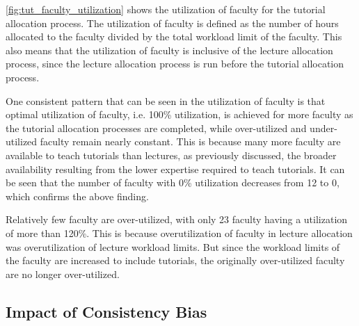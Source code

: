 \autoref{fig:tut_faculty_utilization} shows the utilization of faculty for the tutorial allocation process. The utilization of faculty is defined as the number of hours allocated to the faculty divided by the total workload limit of the faculty. This also means that the utilization of faculty is inclusive of the lecture allocation process, since the lecture allocation process is run before the tutorial allocation process.

One consistent pattern that can be seen in the utilization of faculty is that optimal utilization of faculty, i.e. 100\% utilization, is achieved for more faculty as the tutorial allocation processes are completed, while over-utilized and under-utilized faculty remain nearly constant. This is because many more faculty are available to teach tutorials than lectures, as previously discussed, the broader availability resulting from the lower expertise required to teach tutorials. It can be seen that the number of faculty with 0\% utilization decreases from 12 to 0, which confirms the above finding.

Relatively few faculty are over-utilized, with only 23 faculty having a utilization of more than 120\%. This is because overutilization of faculty in lecture allocation was overutilization of lecture workload limits. But since the workload limits of the faculty are increased to include tutorials, the originally over-utilized faculty are no longer over-utilized.

\subsection{Impact of Consistency Bias}

